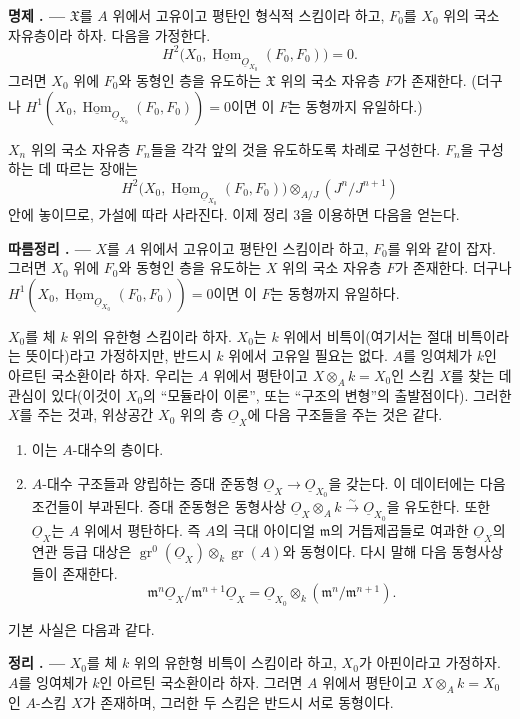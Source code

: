 \documentclass[11pt,twoside,openany]{book}
\numberwithin{equation}{section}
\newcommand{\sourceunit}{front}
\newcommand{\src}[1]{%
  \phantomsection\hypertarget{src:\sourceunit:#1}{}%
  \marginpar{\raggedleft\footnotesize\sffamily #1}%
}
\newcommand{\Osh}{\underline{O}}
\newcommand{\Homsh}{\underline{\operatorname{Hom}}}
\theoremstyle{plain}
\theoremstyle{definition}
\theoremstyle{remark}
\newcommand{\result}[2]{%
  \par\medskip\noindent\textbf{#1%
  \if\relax\detokenize{#2}\relax\else\space#2\fi. ---}\enspace
}
\begin{document}
\result{명제}{3} $\mathfrak X$를 $A$ 위에서 고유이고 평탄인 형식적
스킴이라 하고, $F_0$를 $X_0$ 위의 국소 자유층이라 하자. 다음을 가정한다.
\[
  H^2\bigl(X_0,\Homsh_{\Osh_{X_0}}(F_0,F_0)\bigr)=0.
\]
그러면 $X_0$ 위에 $F_0$와 동형인 층을 유도하는 $\mathfrak X$ 위의 국소
자유층 $F$가 존재한다. (더구나
$H^1(X_0,\Homsh_{\Osh_{X_0}}(F_0,F_0))=0$이면 이 $F$는 동형까지
유일하다.)

$X_n$ 위의 국소 자유층 $F_n$들을 각각 앞의 것을 유도하도록 차례로
구성한다. $F_n$을 구성하는 데 따르는 장애는
\[
  H^2\bigl(X_0,\Homsh_{\Osh_{X_0}}(F_0,F_0)\bigr)
  \otimes_{A/J}(J^n/J^{n+1})
\]
안에 놓이므로, 가설에 따라 사라진다. 이제 정리 3을 이용하면 다음을 얻는다.

\result{따름정리}{1} $X$를 $A$ 위에서 고유이고 평탄인 스킴이라 하고,
$F_0$를 위와 같이 잡자. 그러면 $X_0$ 위에 $F_0$와 동형인 층을 유도하는
$X$ 위의 국소 자유층 $F$가 존재한다. 더구나
$H^1(X_0,\Homsh_{\Osh_{X_0}}(F_0,F_0))=0$이면 이 $F$는 동형까지
유일하다.

$X_0$를 체 $k$ 위의 유한형 스킴이라 하자. $X_0$는 $k$ 위에서
비특이(여기서는 절대 비특이라는 뜻이다)라고 가정하지만, 반드시 $k$ 위에서
고유일 필요는 없다. $A$를 잉여체가 $k$인 아르틴 국소환이라 하자. 우리는
$A$ 위에서 평탄이고
$X\otimes_A k=X_0$인 스킴 $X$를 찾는 데 관심이 있다(이것이 $X_0$의
``모듈라이 이론'', 또는 ``구조의 변형''의 출발점이다). 그러한 $X$를 주는
것과, 위상공간 $X_0$ 위의 층 $\Osh_X$에 다음 구조들을 주는 것은 같다.
\begin{enumerate}
  \item[\textit{i.}] 이는 $A$-대수의 층이다.
  \item[\textit{ii.}] $A$-대수 구조들과 양립하는 증대 준동형
    $\Osh_X\longrightarrow\Osh_{X_0}$을 갖는다. 이 데이터에는 다음 조건들이
    부과된다. 증대 준동형은 동형사상
    $\Osh_X\otimes_A k\xrightarrow{\sim}\Osh_{X_0}$을 유도한다. 또한
    $\Osh_X$는 $A$ 위에서 평탄하다. 즉 $A$의 극대 아이디얼
    $\mathfrak m$의 거듭제곱들로 여과한 $\Osh_X$의 연관 등급 대상은
    $\operatorname{gr}^0(\Osh_X)\otimes_k\operatorname{gr}(A)$와 동형이다.
    다시 말해 다음 동형사상들이 존재한다.
    \[
      \mathfrak m^n\Osh_X/\mathfrak m^{n+1}\Osh_X
      =\Osh_{X_0}\otimes_k(\mathfrak m^n/\mathfrak m^{n+1}).
    \]
\end{enumerate}
기본 사실은 다음과 같다.

\src{204}
\result{정리}{8} $X_0$를 체 $k$ 위의 유한형 비특이 스킴이라 하고,
$X_0$가 아핀이라고 가정하자. $A$를 잉여체가 $k$인 아르틴 국소환이라
하자. 그러면 $A$ 위에서 평탄이고 $X\otimes_A k=X_0$인 $A$-스킴 $X$가
존재하며, 그러한 두 스킴은 반드시 서로 동형이다.
\end{document}
